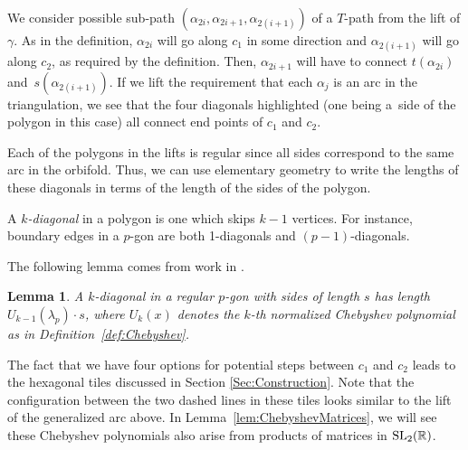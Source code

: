\documentclass[pdftex]{sigma}%
\newcommand{\Real}{\mathbb{R}}
\numberwithin{equation}{section}
\newtheorem{Lemma}[Theorem]{Lemma}
\begin{document}
\begin{center}
\end{center}

We consider possible sub-path $(\alpha_{2i},\alpha_{2i+1}, \alpha_{2(i+1)})$ of a $T$-path from the lift of $\gamma$. As in the definition, $\alpha_{2i}$ will go along $c_1$ in some direction and $\alpha_{2(i+1)}$ will go along $c_2$, as required by the definition. Then, $\alpha_{2i+1}$ will have to connect $t(\alpha_{2i})$ and~$s(\alpha_{2(i+1)})$. If we lift the requirement that each $\alpha_j$ is an arc in the triangulation, we see that the four diagonals highlighted (one being a~side of the polygon in this case) all connect end points of $c_1$ and $c_2$.

Each of the polygons in the lifts is regular since all sides correspond to the same arc in the orbifold. Thus, we can use elementary geometry to write the lengths of these diagonals in terms of the length of the sides of the polygon.

\begin{Definition}\label{def:kdiagonal}
A \emph{$k$-diagonal} in a polygon is one which skips $k-1$ vertices. For instance, boundary edges in a $p$-gon are both 1-diagonals and $(p-1)$-diagonals.
\end{Definition}

The following lemma comes from work in \cite{Lang}.

\begin{Lemma} \label{lem:polygonlength}
A $k$-diagonal in a regular $p$-gon with sides of length $s$ has length $U_{k-1}(\lambda_p) \cdot s$, where $U_k(x)$ denotes the $k$-th normalized Chebyshev polynomial as in Definition~{\rm \ref{def:Chebyshev}}.
\end{Lemma}

The fact that we have four options for potential steps between $c_1$ and $c_2$ leads to the hexagonal tiles discussed in Section \ref{Sec:Construction}. Note that the configuration between the two dashed lines in these tiles looks similar to the lift of the generalized arc above. In Lemma~\ref{lem:ChebyshevMatrices}, we will see these Chebyshev polynomials also arise from products of matrices in ${\rm SL}_2(\Real)$.
\end{document}
